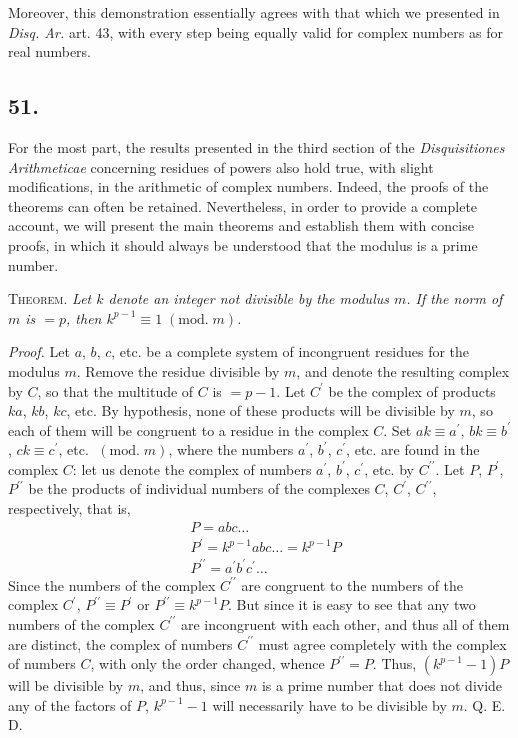 \documentclass[twoside,12pt]{memoir}
\renewcommand{\pmod}[1]{\;(\textrm{mod.}\;#1)}
\begin{document}
Moreover, this demonstration essentially agrees with that which we presented in \textit{Disq. Ar.} art. 43, with every step being equally valid for complex numbers as for real numbers.
%

\subsection*{51.}

For the most part, the results presented in the third section of the \textit{Disquisitiones Arithmeticae} concerning residues of powers also hold true, with slight modifications, in the arithmetic of complex numbers. Indeed, the proofs of the theorems can often be retained. Nevertheless, in order to provide a complete account, we will present the main theorems and establish them with concise proofs, in which it should always be understood that the modulus is a prime number.
%

\textsc{Theorem.} \textit{Let \(k\) denote an integer not divisible by the modulus \(m\).  If the norm of \(m\) is \(=p\), then \(k^{p-1} \equiv 1 \pmod{m}\).}
 
\textit{Proof.} Let \(a\), \(b\), \(c\), etc{.} be a complete system of incongruent residues for the modulus \(m\).  Remove the residue divisible by \(m\), and denote the resulting complex by \(C\), so that the multitude of \(C\) is \(=p-1\).  Let \(C^{\prime}\) be the complex of products \(k a\), \(k b\), \(k c\), etc.  By hypothesis, none of these products will be divisible by \(m\), so each of them will be congruent to a residue in the complex \(C\).  Set \(a k \equiv a^{\prime}\), \(b k \equiv b^{\prime}\), \(c k \equiv c^{\prime}\), etc{.} \(\pmod{m}\), where the numbers \(a^{\prime}\), \(b^{\prime}\), \(c^{\prime}\), etc{.} are found in the complex \(C\): let us denote the complex of numbers \(a^{\prime}\), \(b^{\prime}\), \(c^{\prime}\), etc{.} by \(C^{\prime \prime}\). Let \(P\), \(P^{\prime}\), \(P^{\prime \prime}\) be the products of individual numbers of the complexes \(C\), \(C^{\prime}\), \(C^{\prime \prime}\), respectively, that is,
\[\begin{aligned}
& P=a b c \ldots \\
& P^{\prime}=k^{p-1} a b c \ldots=k^{p-1} P \\
& P^{\prime \prime}=a^{\prime} b^{\prime} c^{\prime} \ldots
\end{aligned}\]
Since the numbers of the complex \(C^{\prime \prime}\) are congruent to the numbers of the complex \(C^{\prime}\), \(P^{\prime \prime} \equiv P^{\prime}\) or \(P^{\prime \prime} \equiv k^{p-1} P\). But since it is easy to see that any two numbers of the complex \(C^{\prime \prime}\) are incongruent with each other, and thus all of them are distinct, the complex of numbers \(C^{\prime \prime}\) must agree completely with the complex of numbers \(C\), with only the order changed, whence \(P^{\prime \prime}=P\). Thus, \((k^{p-1}-1) P\) will be divisible by \(m\), and thus, since \(m\) is a prime number that does not divide any of the factors of \(P\), \(k^{p-1}-1\) will necessarily have to be divisible by \(m\). Q. E. D.
%
\end{document}
